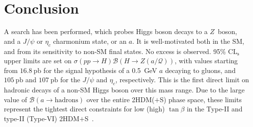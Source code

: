 \documentclass[NOTE, atlasdraft=true, texlive=2017, UKenglish]{\ATLASLATEXPATH atlasdoc}
\begin{document}
\section{Conclusion}
\label{sec:conclusion}

A search has been performed, which probes Higgs boson decays to a $Z$~boson, and a $J/\psi$ or $\eta_c$ charmonium state, or an $a$. It is well-motivated both in the SM, and from its sensitivity to non-SM final states. No excess is observed. 95\% $\text{CL}_\text{s}$ upper limits are set on $\sigma(pp\to H)\mathcal{B}(H\to Z(a/\mathcal{Q}))$, with values starting from $16.8~\text{pb}$ for the signal hypothesis of a 0.5~GeV $a$ decaying to gluons, and $105~\text{pb}$ and $107~\text{pb}$ for the $J/\psi$ and $\eta_c$, respectively. This is the first direct limit on hadronic decays of a non-SM Higgs boson over this mass range. Due to the large value of $\mathcal{B}(a \to \text{hadrons})$ over the entire 2HDM($+$S) phase space, these limits represent the tightest direct constraints for low (high) $\tan\beta$ in the Type-II and type-II (Type-VI) 2HDM$+$S~\cite{ATL-PHYS-PUB-2018-045}.



\printbibliography
% 
% 

\end{document}
